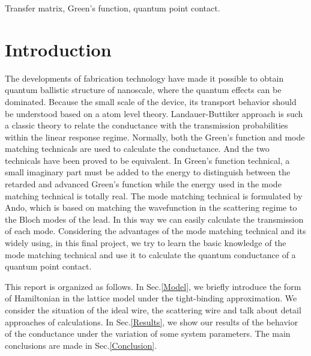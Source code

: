 \documentclass[journal]{IEEEtran}
\begin{document}
\begin{IEEEkeywords}
Transfer matrix, Green's function, quantum point contact.
\end{IEEEkeywords}

%
\IEEEpeerreviewmaketitle

\section{Introduction}
The developments of fabrication technology have made it possible to obtain quantum ballistic structure of nanoscale,
where the quantum effects can be dominated. Because the small scale of the device, its transport behavior should be
understood based on a atom level theory. Landauer-Buttiker approach is such a classic theory to relate the conductance
with the transmission probabilities within the linear response regime. Normally, both the Green's function and mode
matching technicals are used to calculate the conductance. And the two technicals have been proved to be equivalent. In
Green's function technical, a small imaginary part must be added to the energy to distinguish between the retarded and
advanced Green's function while the energy used in the mode matching technical is totally real. The mode matching
technical is formulated by Ando, which is based on matching the wavefunction in the scattering regime to the Bloch modes
of the lead. In this way we can easily calculate the transmission of each mode. Considering the advantages of the mode
matching technical and its widely using, in this final project, we try to learn the basic knowledge of the mode matching
technical and use it to calculate the quantum conductance of a quantum point contact.

This report is organized as follows. In Sec.\ref{Model}, we briefly introduce the form of Hamiltonian in the lattice
model under the tight-binding approximation. We consider the situation of the ideal wire, the scattering wire and talk
about detail approaches of calculations. In Sec.\ref{Results}, we show our results of the behavior of the conductance
under the variation of some system parameters. The main conclusions are made in Sec.\ref{Conclusion}.
\end{document}

